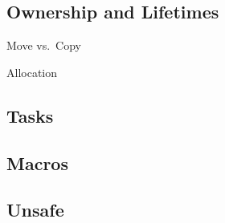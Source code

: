 \documentclass[]{article}
\begin{document}
\subsection{Ownership and Lifetimes}\label{ownership-and-lifetimes}

Move vs.~Copy

Allocation

\subsection{Tasks}\label{tasks}

\subsection{Macros}\label{macros}

\subsection{Unsafe}\label{unsafe}
\end{document}
